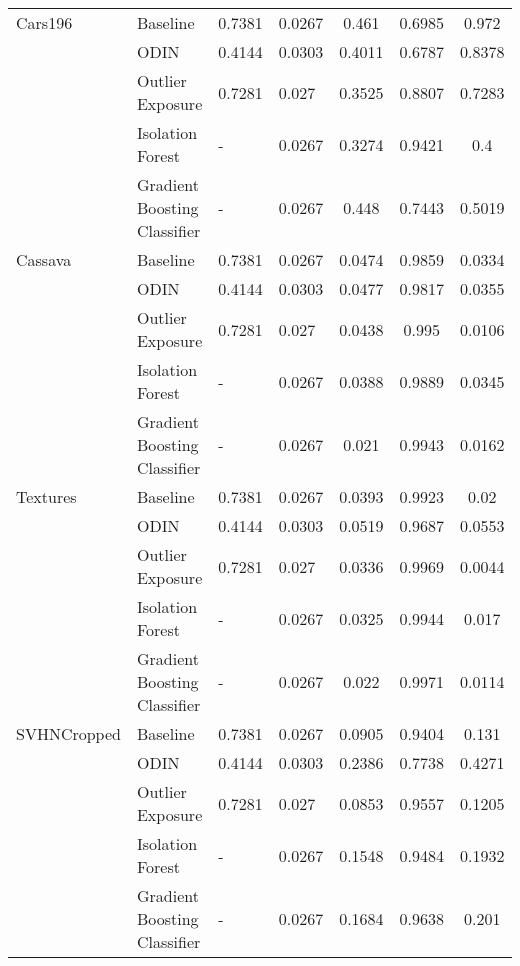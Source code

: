 \documentclass{article}
\begin{document}
\begin{table}[h]
\begin{tabular}{lllHccc}
\midrule
Cars196 & Baseline &        0.7381 &               0.0267 &     0.461 &  0.6985 &          0.972 \\
            & ODIN &        0.4144 &               0.0303 &    0.4011 &  0.6787 &         0.8378 \\
            & Outlier Exposure &        0.7281 &                0.027 &    0.3525 &  0.8807 &         0.7283 \\
            & Isolation Forest &             - &               0.0267 &    0.3274 &  0.9421 &            0.4 \\
            & Gradient Boosting Classifier &             - &               0.0267 &     0.448 &  0.7443 &         0.5019 \\
\midrule
Cassava & Baseline &        0.7381 &               0.0267 &    0.0474 &  0.9859 &         0.0334 \\
            & ODIN &        0.4144 &               0.0303 &    0.0477 &  0.9817 &         0.0355 \\
            & Outlier Exposure &        0.7281 &                0.027 &    0.0438 &   0.995 &         0.0106 \\
            & Isolation Forest &             - &               0.0267 &    0.0388 &  0.9889 &         0.0345 \\
            & Gradient Boosting Classifier &             - &               0.0267 &     0.021 &  0.9943 &         0.0162 \\
\midrule
Textures & Baseline &        0.7381 &               0.0267 &    0.0393 &  0.9923 &           0.02 \\
            & ODIN &        0.4144 &               0.0303 &    0.0519 &  0.9687 &         0.0553 \\
            & Outlier Exposure &        0.7281 &                0.027 &    0.0336 &  0.9969 &         0.0044 \\
            & Isolation Forest &             - &               0.0267 &    0.0325 &  0.9944 &          0.017 \\
            & Gradient Boosting Classifier &             - &               0.0267 &     0.022 &  0.9971 &         0.0114 \\
\midrule
SVHNCropped & Baseline &        0.7381 &               0.0267 &    0.0905 &  0.9404 &          0.131 \\
            & ODIN &        0.4144 &               0.0303 &    0.2386 &  0.7738 &         0.4271 \\
            & Outlier Exposure &        0.7281 &                0.027 &    0.0853 &  0.9557 &         0.1205 \\
            & Isolation Forest &             - &               0.0267 &    0.1548 &  0.9484 &         0.1932 \\
            & Gradient Boosting Classifier &             - &               0.0267 &    0.1684 &  0.9638 &          0.201 \\
\bottomrule
\end{tabular}
\end{table}
\end{document}
